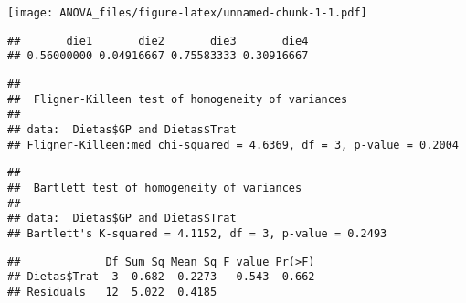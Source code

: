 \documentclass[
]{article}
\newenvironment{Shaded}{\begin{snugshade}}{\end{snugshade}}
\newcommand{\FunctionTok}[1]{\textcolor[rgb]{0.00,0.00,0.00}{#1}}
\newcommand{\NormalTok}[1]{#1}
\newcommand{\OtherTok}[1]{\textcolor[rgb]{0.56,0.35,0.01}{#1}}
\newcommand{\SpecialCharTok}[1]{\textcolor[rgb]{0.00,0.00,0.00}{#1}}
\begin{document}
\texttt{[image: ANOVA\_files/figure-latex/unnamed-chunk-1-1.pdf]}

\begin{Shaded}
\end{Shaded}

\begin{verbatim}
##       die1       die2       die3       die4 
## 0.56000000 0.04916667 0.75583333 0.30916667
\end{verbatim}

\begin{Shaded}
\end{Shaded}

\begin{verbatim}
## 
##  Fligner-Killeen test of homogeneity of variances
## 
## data:  Dietas$GP and Dietas$Trat
## Fligner-Killeen:med chi-squared = 4.6369, df = 3, p-value = 0.2004
\end{verbatim}

\begin{Shaded}
\end{Shaded}

\begin{verbatim}
## 
##  Bartlett test of homogeneity of variances
## 
## data:  Dietas$GP and Dietas$Trat
## Bartlett's K-squared = 4.1152, df = 3, p-value = 0.2493
\end{verbatim}

\begin{Shaded}
\end{Shaded}

\begin{verbatim}
##             Df Sum Sq Mean Sq F value Pr(>F)
## Dietas$Trat  3  0.682  0.2273   0.543  0.662
## Residuals   12  5.022  0.4185
\end{verbatim}
\end{document}
